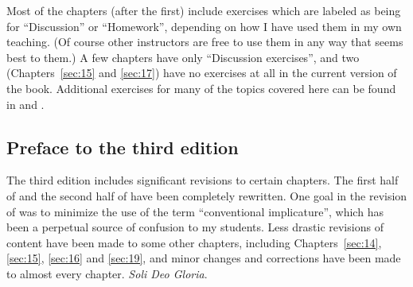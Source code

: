 \begin{refsection}
Most of the chapters (after the first) include exercises which are labeled as being for “Discussion” or “Homework”, depending on how I have used them in my own teaching. (Of course other instructors are free to use them in any way that seems best to them.) A few chapters have only “Discussion exercises”, and two (Chapters~\ref{sec:15} and \ref{sec:17}) have no exercises at all in the current version of the book. Additional exercises for many of the topics covered here can be found in \citet{Saeed2009} and \citet{Kearns2000}.

\subsection*{Preface to the third edition}

The third edition includes significant revisions to certain chapters. The first half of  and the second half of  have been completely rewritten. One goal in the revision of  was to minimize the use of the term “conventional implicature”, which has been a perpetual source of confusion to my students. Less drastic revisions of content have been made to some other chapters, including Chapters~\ref{sec:14}, \ref{sec:15}, \ref{sec:16} and \ref{sec:19}, and minor changes and corrections have been made to almost every chapter. \textit{Soli Deo Gloria}.


\printbibliography[heading=subbibliography]
\end{refsection}
